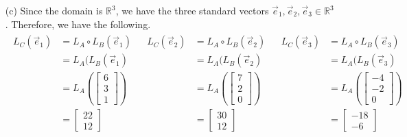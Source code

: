 \begin{SaveQuestion}
\begin{enumerate}
\begin{enumerate}
            \item[(c)] Since the domain is $\mathbb{R}^3$, we have the three standard vectors $\vec e_1, \vec e_2, \vec e_3 \in \mathbb{R}^3$. Therefore, we have the following.
            $$\begin{matrix}
            \begin{array}{cl}
                L_C(\vec e_1)   &= L_A \circ L_B(\vec e_1) \\
                                &= L_A(L_B(\vec e_1) \\
                                &= L_A\left(\begin{bmatrix} 6 \\ 3 \\ 1 \end{bmatrix}\right) \\
                                &= \begin{bmatrix} 22 \\ 12 \end{bmatrix}
            \end{array}&
            \begin{array}{cl}
                L_C(\vec e_2)   &= L_A \circ L_B(\vec e_2) \\
                                &= L_A(L_B(\vec e_2) \\
                                &= L_A\left(\begin{bmatrix} 7 \\ 2 \\ 0 \end{bmatrix}\right) \\
                                &= \begin{bmatrix} 30 \\ 12 \end{bmatrix}
            \end{array}&
            \begin{array}{cl}
                L_C(\vec e_3)   &= L_A \circ L_B(\vec e_3) \\
                                &= L_A(L_B(\vec e_3) \\
                                &= L_A\left(\begin{bmatrix} -4 \\ -2 \\ 0 \end{bmatrix}\right) \\
                                &= \begin{bmatrix} -18 \\ -6 \end{bmatrix}

\end{array}
\end{matrix}$$
\end{enumerate}
\end{enumerate}
\end{SaveQuestion}
